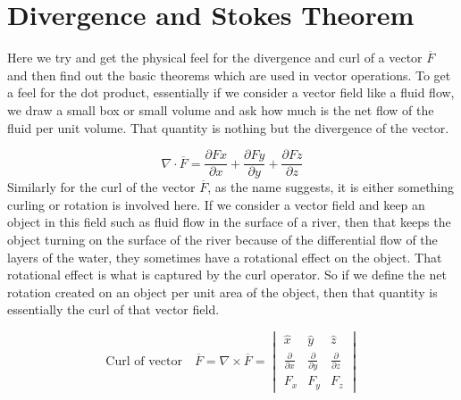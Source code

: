 \chapter{Divergence and Stokes Theorem}\label{lec:lec17}
Here we try and get the physical feel for the divergence and curl of a vector $\overline{F}$  and then find out the basic theorems which are used in vector operations.
To get a feel for the dot product, essentially if we consider a vector field like a fluid flow, we draw a small box or small volume and ask how much is the net flow of the fluid per unit volume. That quantity is nothing but the divergence of the vector.

\begin{equation}
\nabla\cdot \overline{F} = \frac{\partial Fx}{\partial x} + \frac{\partial Fy}{\partial y} + \frac{\partial Fz}{\partial z}	
\end{equation}
Similarly for the curl of the vector $\overline{F}$, as the name suggests, it is either something curling or rotation is involved here. If we consider a vector field and keep an object in this field such as fluid flow in the surface of a river, then that keeps the object turning on the surface of the river because of the differential flow of the layers of the water, they sometimes have a rotational effect on the object. That rotational effect is what is captured by the curl operator. So if we define the net rotation created on an object per unit area of the object, then that quantity is essentially the curl of that vector field.

\begin{dmath*}
	\text{Curl of vector} \quad \overline{F} = \nabla \times \overline{F} = 
	\begin{vmatrix}
		\hat{x} & \hat{y} & \hat{z}\\
		\frac{\partial}{\partial x} & \frac{\partial}{\partial y} & \frac{\partial}{\partial z}\\
		F_{x} & F_{y} & F_{z}
	\end{vmatrix}
\end{dmath*}


